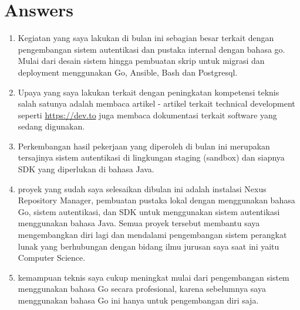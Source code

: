 \documentclass[12pt, letterpaper]{article}
\begin{document}
\section*{Answers}
\begin{enumerate}
    \item Kegiatan yang saya lakukan di bulan ini sebagian besar terkait dengan pengembangan sistem autentikasi dan pustaka internal dengan bahasa go. Mulai dari desain sistem hingga pembuatan skrip untuk migrasi dan deployment menggunakan Go, Ansible, Bash dan Postgresql.
    \item Upaya yang saya lakukan terkait dengan peningkatan kompetensi teknis salah satunya adalah membaca artikel - artikel terkait technical development seperti \url{https://dev.to} juga membaca dokumentasi terkait software yang sedang digunakan.
    \item Perkembangan hasil pekerjaan yang diperoleh di bulan ini merupakan tersajinya sistem autentikasi di lingkungan staging (sandbox) dan siapnya SDK yang diperlukan di bahasa Java.
    \item proyek yang sudah saya selesaikan dibulan ini adalah instalasi Nexus Repository Manager, pembuatan pustaka lokal dengan menggunakan bahasa Go, sistem autentikasi, dan SDK untuk menggunakan sistem autentikasi menggunakan bahasa Java. Semua proyek tersebut membantu saya mengembangkan diri lagi dan mendalami pengembangan sistem perangkat lunak yang berhubungan dengan bidang ilmu jurusan saya saat ini yaitu Computer Science.
    \item kemampuan teknis saya cukup meningkat mulai dari pengembangan sistem menggunakan bahasa Go secara profesional, karena sebelumnya saya menggunakan bahasa Go ini hanya untuk pengembangan diri saja.
\end{enumerate}
\end{document}
